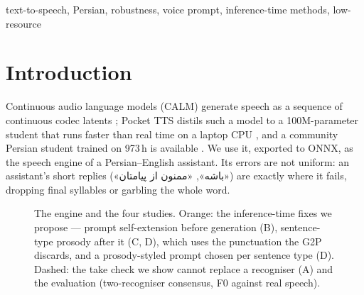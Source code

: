 \documentclass[conference]{IEEEtran}
\newcommand{\fa}[1]{{\persianfont\beginR #1\endR}}
\newcommand{\RES}[1]{\textcolor{red}{#1}}
\begin{document}
\begin{abstract}
With it, the engine's retries can be dropped, halving the generation work while remaining more accurate.
(iv)~\emph{Intonation:} the model never sees punctuation, so a yes/no question is rendered sample-for-sample
like its statement twin. Restoring the contour after synthesis from the written mark --- a final rise
measured against real speech, applied by pitch-synchronous overlap-add --- moves the end of held-out yes/no
questions \RES{4.7} semitones above their statement twins (\RES{0.0} before; \RES{4.75} in real speech)
without new recognition failures, at the UTMOS cost of the signal processing (\RES{$-$0.24}).
(v)~\emph{Expressive prosody:} the voice prompt carries register and pitch range into the take, so we make
a livelier prompt from the model's own reading (re-pitched, widened, louder) and generate exclamations and
surprised questions from it; the audio rule keeps only the endings and the energy, and a loudness plan
spans the text. On held-out sentences, yes/no questions are heard as questions by a recogniser three times
as often (\RES{12\%} vs.\ \RES{4\%}), exclamations get a \RES{38\%} wider pitch range and \RES{2.2}\,dB more
level at almost no UTMOS cost (\RES{$-$0.02} vs.\ \RES{$-$0.24}), sentence loudness through a text varies
twice as much, and intelligibility is unchanged.
\end{abstract}

\begin{IEEEkeywords}
text-to-speech, Persian, robustness, voice prompt, inference-time methods, low-resource
\end{IEEEkeywords}

\section{Introduction}
Continuous audio language models (CALM) generate speech as a sequence of continuous codec latents
\cite{calm2025}; Pocket TTS distils such a model to a 100M-parameter student that runs faster than real
time on a laptop CPU \cite{pockettts2026}, and a community Persian student trained on 973\,h is available
\cite{farsiv2}. We use it, exported to ONNX, as the speech engine of a Persian--English assistant. Its
errors are not uniform: an assistant's short replies (\fa{«باشه»}, \fa{«ممنون از پیامتان»}) are exactly where it fails,
dropping final syllables or garbling the whole word.

\begin{figure}[t]
\centering

\caption{The engine and the four studies. Orange: the inference-time fixes we propose --- prompt
self-extension before generation (B), sentence-type prosody after it (C, D), which uses the
punctuation the G2P discards, and a prosody-styled prompt chosen per sentence type (D). Dashed: the take check we show cannot replace a recogniser (A) and the
evaluation (two-recogniser consensus, F0 against real speech).}
\label{fig:pipeline}
\end{figure}
\end{document}

